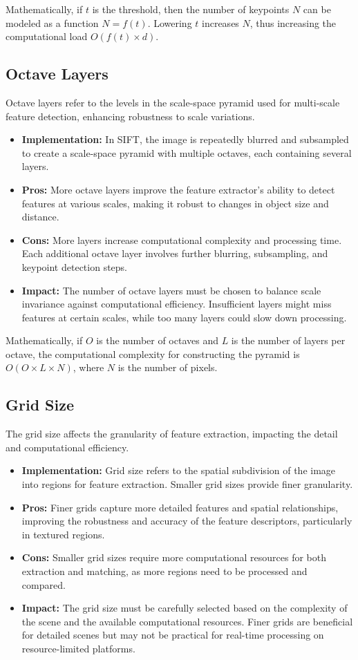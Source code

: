Mathematically, if $t$ is the threshold, then the number of keypoints $N$ can be modeled as a function $N = f(t)$. Lowering $t$ increases $N$, thus increasing the computational load $O(f(t) \times d)$.

\subsection{Octave Layers}
Octave layers refer to the levels in the scale-space pyramid used for multi-scale feature detection, enhancing robustness to scale variations.
\begin{itemize}
    \item \textbf{Implementation:} In SIFT, the image is repeatedly blurred and subsampled to create a scale-space pyramid with multiple octaves, each containing several layers.
    \item \textbf{Pros:} More octave layers improve the feature extractor's ability to detect features at various scales, making it robust to changes in object size and distance.
    \item \textbf{Cons:} More layers increase computational complexity and processing time. Each additional octave layer involves further blurring, subsampling, and keypoint detection steps.
    \item \textbf{Impact:} The number of octave layers must be chosen to balance scale invariance against computational efficiency. Insufficient layers might miss features at certain scales, while too many layers could slow down processing.
\end{itemize}

Mathematically, if $O$ is the number of octaves and $L$ is the number of layers per octave, the computational complexity for constructing the pyramid is $O(O \times L \times N)$, where $N$ is the number of pixels.

\subsection{Grid Size}
The grid size affects the granularity of feature extraction, impacting the detail and computational efficiency.
\begin{itemize}
    \item \textbf{Implementation:} Grid size refers to the spatial subdivision of the image into regions for feature extraction. Smaller grid sizes provide finer granularity.
    \item \textbf{Pros:} Finer grids capture more detailed features and spatial relationships, improving the robustness and accuracy of the feature descriptors, particularly in textured regions.
    \item \textbf{Cons:} Smaller grid sizes require more computational resources for both extraction and matching, as more regions need to be processed and compared.
    \item \textbf{Impact:} The grid size must be carefully selected based on the complexity of the scene and the available computational resources. Finer grids are beneficial for detailed scenes but may not be practical for real-time processing on resource-limited platforms.
\end{itemize}


